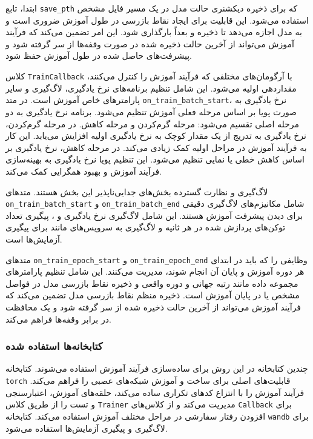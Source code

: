 ابتدا، تابع \texttt{save\_pth}  که برای ذخیره دیکشنری حالت
مدل در یک مسیر فایل مشخص استفاده می‌شود. این قابلیت برای ایجاد نقاط
بازرسی در طول آموزش ضروری است و به مدل اجازه می‌دهد تا ذخیره و بعداً
بارگذاری شود. این امر تضمین می‌کند که فرآیند آموزش می‌تواند از آخرین حالت
ذخیره شده در صورت وقفه‌ها از سر گرفته شود و پیشرفت‌های حاصل شده در طول
آموزش حفظ شود.

کلاس \texttt{TrainCallback} با آرگومان‌های مختلفی که فرآیند آموزش را
کنترل می‌کنند، مقداردهی اولیه می‌شود. این شامل تنظیم برنامه‌های نرخ
یادگیری، لاگ‌گیری و سایر پارامترهای خاص آموزش است. در متد
\texttt{on\_train\_batch\_start}، نرخ یادگیری به صورت پویا بر اساس مرحله
فعلی آموزش تنظیم می‌شود. برنامه نرخ یادگیری به دو مرحله اصلی تقسیم می‌شود:
مرحله گرم‌کردن  و مرحله کاهش. در مرحله گرم‌کردن، نرخ یادگیری به تدریج از یک
مقدار کوچک به نرخ یادگیری اولیه افزایش می‌یابد. این کار به فرآیند
آموزش در مراحل اولیه کمک زیادی می‌کند. در مرحله کاهش، نرخ یادگیری بر اساس کاهش
خطی یا نمایی تنظیم می‌شود. این تنظیم پویا نرخ
یادگیری به بهینه‌سازی فرآیند آموزش و بهبود همگرایی کمک می‌کند.

لاگ‌گیری و نظارت گسترده بخش‌های جدایی‌ناپذیر این بخش هستند. متدهای
\texttt{on\_train\_batch\_start} و \texttt{on\_train\_batch\_end} شامل
مکانیزم‌های لاگ‌گیری دقیقی برای دیدن پیشرفت آموزش هستند. این شامل
لاگ‌گیری نرخ یادگیری و ، پیگیری تعداد توکن‌های پردازش شده در هر
ثانیه و لاگ‌گیری به سرویس‌های مانند  \cite{wandb} برای
پیگیری آزمایش‌ها است.

متدهای \texttt{on\_train\_epoch\_start} و \texttt{on\_train\_epoch\_end}
وظایفی را که باید در ابتدای هر دوره آموزش و پایان آن انجام شوند، مدیریت
می‌کنند. این شامل تنظیم پارامترهای مجموعه داده مانند رتبه جهانی و دوره
واقعی و ذخیره نقاط بازرسی مدل در فواصل مشخص یا در پایان آموزش است. ذخیره
منظم نقاط بازرسی مدل تضمین می‌کند که فرآیند آموزش می‌تواند از آخرین حالت
ذخیره شده از سر گرفته شود و یک محافظت در برابر وقفه‌ها فراهم می‌کند.

\subsubsection{کتابخانه‌ها استفاده شده}
چندین کتابخانه در این روش برای ساده‌سازی فرآیند آموزش استفاده می‌شوند.
کتابخانه \texttt{torch} \cite{paszke2017automatic}  قابلیت‌های اصلی برای ساخت و آموزش
شبکه‌های عصبی را فراهم می‌کند.  \cite{Falcon_PyTorch_Lightning_2019} فرآیند آموزش را با انتزاع
کدهای تکراری ساده می‌کند، حلقه‌های آموزش، اعتبارسنجی و تست را از طریق کلاس
\texttt{Trainer} مدیریت می‌کند و از کلاس‌های \texttt{Callback} برای افزودن
رفتار سفارشی در مراحل مختلف آموزش استفاده می‌کند. کتابخانه \texttt{wandb}
برای لاگ‌گیری و پیگیری آزمایش‌ها استفاده می‌شود.

